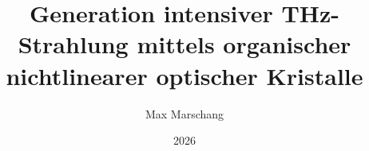 \documentclass[
  tucolor,       %
  BCOR=12mm,     %
  parskip=half,  %
  open=any,      %
  cleardoublepage=plain,  %
]{tudothesis}
\author{Max Marschang}
\title{Generation intensiver THz-Strahlung mittels organischer nichtlinearer optischer Kristalle}
\date{2026}
\begin{document}
\frontmatter
% 
\maketitle

\makecorrectorpage


\tableofcontents

\mainmatter





\appendix


\backmatter
\printbibliography

\cleardoublepage

\end{document}
